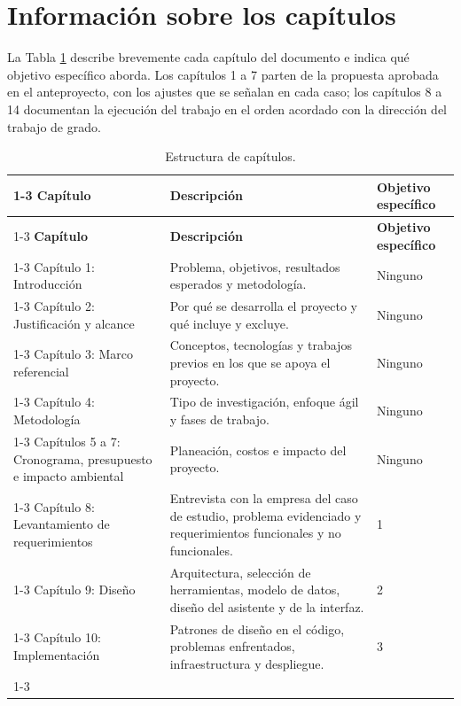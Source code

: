 
\section{Información sobre los capítulos}

La Tabla \ref{tab:estructura_capitulos} describe brevemente cada capítulo del documento e indica qué objetivo específico aborda. Los capítulos 1 a 7 parten de la propuesta aprobada en el anteproyecto, con los ajustes que se señalan en cada caso; los capítulos 8 a 14 documentan la ejecución del trabajo en el orden acordado con la dirección del trabajo de grado.

\begin{longtable}{|p{4.3cm}|p{8.7cm}|p{2.3cm}|}
\caption{Estructura de capítulos.}\label{tab:estructura_capitulos}\\
\cline{1-3}
\cellcolor[gray]{0.9}\textbf{Capítulo} & \cellcolor[gray]{0.9}\textbf{Descripción} & \cellcolor[gray]{0.9}\textbf{Objetivo específico}\\
\cline{1-3}
\endfirsthead
\cline{1-3}
\cellcolor[gray]{0.9}\textbf{Capítulo} & \cellcolor[gray]{0.9}\textbf{Descripción} & \cellcolor[gray]{0.9}\textbf{Objetivo específico}\\
\cline{1-3}
\endhead
Capítulo 1: Introducción & Problema, objetivos, resultados esperados y metodología. & Ninguno\\ \cline{1-3}
Capítulo 2: Justificación y alcance & Por qué se desarrolla el proyecto y qué incluye y excluye. & Ninguno\\ \cline{1-3}
Capítulo 3: Marco referencial & Conceptos, tecnologías y trabajos previos en los que se apoya el proyecto. & Ninguno\\ \cline{1-3}
Capítulo 4: Metodología & Tipo de investigación, enfoque ágil y fases de trabajo. & Ninguno\\ \cline{1-3}
Capítulos 5 a 7: Cronograma, presupuesto e impacto ambiental & Planeación, costos e impacto del proyecto. & Ninguno\\ \cline{1-3}
Capítulo 8: Levantamiento de requerimientos & Entrevista con la empresa del caso de estudio, problema evidenciado y requerimientos funcionales y no funcionales. & 1\\ \cline{1-3}
Capítulo 9: Diseño & Arquitectura, selección de herramientas, modelo de datos, diseño del asistente y de la interfaz. & 2\\ \cline{1-3}
Capítulo 10: Implementación & Patrones de diseño en el código, problemas enfrentados, infraestructura y despliegue. & 3\\ \cline{1-3}

\end{longtable}
